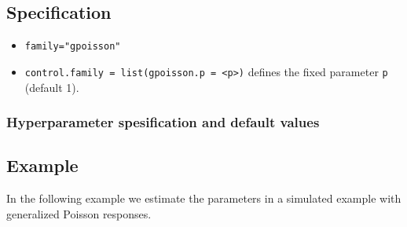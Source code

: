 \documentclass[a4paper,11pt]{article}
\begin{document}
\subsection*{Specification}

\begin{itemize}
\item \texttt{family="gpoisson"}
\item \texttt{control.family = list(gpoisson.p = <p>)} defines the
    fixed parameter \texttt{p} (default 1).
\end{itemize}


\subsubsection*{Hyperparameter spesification and default values}

    
\subsection*{Example}

In the following example we estimate the parameters in a simulated
example with generalized Poisson responses.

\end{document}
